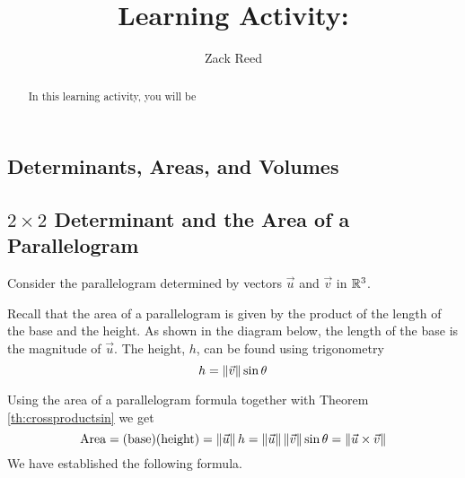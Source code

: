 \documentclass{ximera}
\author{Zack Reed}
\title{Learning Activity: }
\begin{document}
\begin{abstract}

    In this learning activity, you will be 
\end{abstract}
\maketitle

\begin{onlineOnly}
    \section*{Determinants, Areas, and Volumes}
    \end{onlineOnly}
     
    \subsection*{$2\times 2$ Determinant and the Area of a Parallelogram}
     
    Consider the parallelogram determined by vectors $\vec{u}$ and $\vec{v}$ in $\mathbb{R}^3$.
     
    \begin{center}
    \end{center}
     
    Recall that the area of a parallelogram is given by the product of the length of the base and the height.
    As shown in the diagram below, the length of the base is the magnitude of $\vec{u}$. The height, $h$, can be found using trigonometry $$h=\left\|\vec{v}\right\|\sin\theta$$
    \begin{center}
    \end{center}
    Using the area of a parallelogram formula together with Theorem \ref{th:crossproductsin} we get
    $$\mbox{Area}=(\text{base})(\text{height})=\left\|\vec{u}\right\|h=\left\|\vec{u}\right\|\left\|\vec{v}\right\|\sin\theta=\left\|\vec{u}\times\vec{v}\right\|$$
    We have established the following formula.
     
\end{document}
